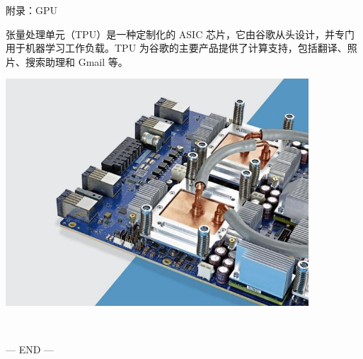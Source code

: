 \begin{frame}[fragile]{附录：GPU}

 张量处理单元（TPU）是一种定制化的 ASIC 芯片，它由谷歌从头设计，并专门用于机器学习工作负载。TPU 为谷歌的主要产品提供了计算支持，包括翻译、照片、搜索助理和 Gmail 等。

 \includegraphics[width=0.85\textwidth]{figure/TPU.jpg}
\end{frame}


\begin{frame}[fragile]{}
 ~ 
\begin{center}
  --- END ---
\end{center}

\end{frame}
